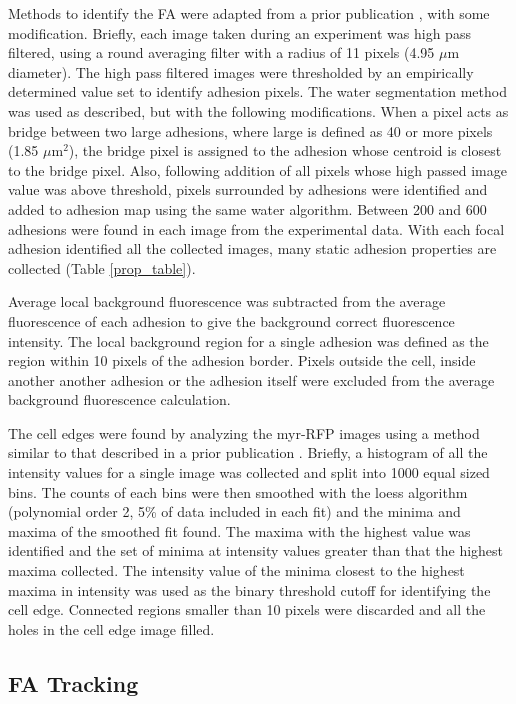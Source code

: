 \documentclass[10pt]{article}
\begin{document}
Methods to identify the FA were adapted from a prior publication
\cite{Zamir1999}, with some modification. Briefly, each image taken during an
experiment was high pass filtered, using a round averaging filter with a radius
of 11 pixels (4.95 $\mu$m diameter). The high pass filtered images were
thresholded by an empirically determined value set to identify adhesion pixels.
The water segmentation method was used as described, but with the following
modifications. When a pixel acts as bridge between two large adhesions, where
large is defined as 40 or more pixels (1.85 $\mu$m$^2$), the bridge pixel is
assigned to the adhesion whose centroid is closest to the bridge pixel. Also,
following addition of all pixels whose high passed image value was above
threshold, pixels surrounded by adhesions were identified and added to adhesion
map using the same water algorithm. Between 200 and 600 adhesions were found in
each image from the experimental data. With each focal adhesion identified all
the collected images, many static adhesion properties are collected (Table
\ref{prop_table}).

Average local background fluorescence was subtracted from the average
fluorescence of each adhesion to give the background correct fluorescence
intensity. The local background region for a single adhesion was defined as the
region within 10 pixels of the adhesion border. Pixels outside the cell, inside
another another adhesion or the adhesion itself were excluded from the average
background fluorescence calculation.

The cell edges were found by analyzing the myr-RFP images using a method similar
to that described in a prior publication \cite{Machacek06}. Briefly, a histogram
of all the intensity values for a single image was collected and split into 1000
equal sized bins. The counts of each bins were then smoothed with the loess
algorithm \cite{Cleveland79} (polynomial order 2, 5\% of data included in each
fit) and the minima and maxima of the smoothed fit found. The maxima with the
highest value was identified and the set of minima at intensity values greater
than that the highest maxima collected. The intensity value of the minima
closest to the highest maxima in intensity was used as the binary threshold
cutoff for identifying the cell edge. Connected regions smaller than 10 pixels
were discarded and all the holes in the cell edge image filled.

\subsection*{FA Tracking}
\end{document}
